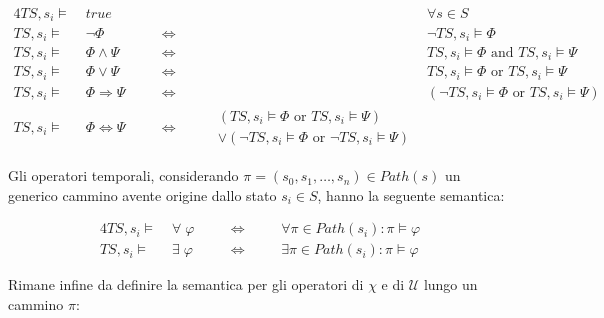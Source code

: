 \begin{alignat}{4}
TS, s_i \models & \; true \; 			&& \quad  && 				\forall  s \in S \\
TS, s_i \models & \; \neg \Phi  			&& \quad \Leftrightarrow \quad &&	\neg TS, s_i  \models \Phi \\
TS, s_i \models & \; \Phi \wedge \Psi 		&&\quad \Leftrightarrow \quad && 	TS, s_i \models \Phi \text{ and } TS , s_i \models \Psi \\
TS, s_i \models & \; \Phi \vee \Psi  		&&\quad \Leftrightarrow \quad &&	TS, s_i \models \Phi \text{ or } TS , s_i \models \Psi \\
TS, s_i \models & \; \Phi \Rightarrow \Psi  	&&\quad \Leftrightarrow \quad && (\neg TS, s_i \models \Phi \text{ or } TS , s_i \models \Psi ) \\
TS, s_i \models & \; \Phi \Leftrightarrow \Psi  	&& \quad \Leftrightarrow \quad 	& \begin{split} &( TS, s_i \models \Phi \text{ or } TS , s_i \models \Psi ) \\ & \vee (\neg TS, s_i \models \Phi \text{ or } \neg TS , s_i \models \Psi )\end{split} 
\end{alignat}

Gli operatori temporali, considerando $\pi = (s_0, s_1, \dots, s_n) \in Path(s)$ un generico cammino avente origine dallo stato $s_i \in S$, hanno la seguente semantica:

\begin{alignat}{4}
TS, s_i \models & \; \forall \;  \varphi 					&& \quad \Leftrightarrow \quad &&  	\forall \pi \in Path(s_i):  \pi \models \varphi  \\
TS, s_i \models & \; \exists \;  \varphi					&& \quad \Leftrightarrow \quad &&	\exists \pi \in Path(s_i):  \pi \models \varphi
\end{alignat}

\clearpage
Rimane infine da definire la semantica per gli operatori di $\chi$ e di $\mathcal{U}$ lungo un cammino $\pi $:

